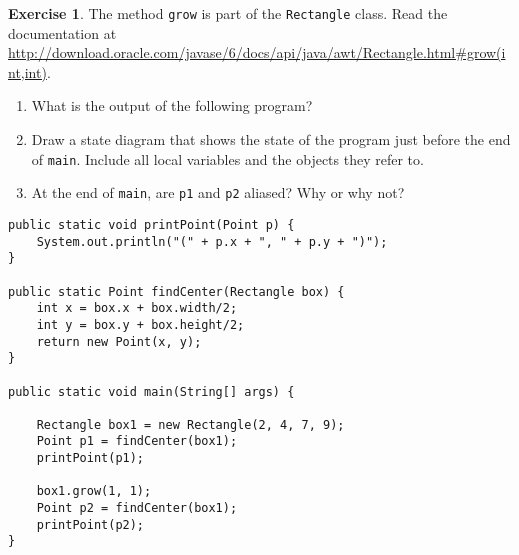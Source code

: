 \documentclass[12pt]{book}
\theoremstyle{definition}
\newtheorem{excz}{Exercise}[chapter]
\newenvironment{exercise}{\bigskip\begin{excz}\mbox{}}{\end{excz}}
\begin{document}
\begin{exercise}
The method {\tt grow} is part of the {\tt Rectangle} class.  Read the
documentation at
\url{http://download.oracle.com/javase/6/docs/api/java/awt/Rectangle.html#grow(int,int)}.

\begin{enumerate}

\item What is the output of the following program?

\item Draw a state diagram that shows the state of the
program just before the end of {\tt main}.
Include all local variables and the objects
they refer to.

\item At the end of {\tt main}, are {\tt p1} and
{\tt p2} aliased?  Why or why not?

\end{enumerate}

\begin{lstlisting}
public static void printPoint(Point p) {
    System.out.println("(" + p.x + ", " + p.y + ")");
}

public static Point findCenter(Rectangle box) {
    int x = box.x + box.width/2;
    int y = box.y + box.height/2;
    return new Point(x, y);
}  

public static void main(String[] args) {

    Rectangle box1 = new Rectangle(2, 4, 7, 9);
    Point p1 = findCenter(box1);
    printPoint(p1);

    box1.grow(1, 1);
    Point p2 = findCenter(box1);
    printPoint(p2);
}
\end{lstlisting}

\end{exercise}
\end{document}
